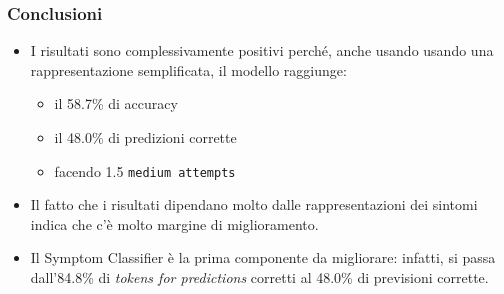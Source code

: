 \documentclass{beamer}
\begin{document}

\begin{frame}
\frametitle{Conclusioni}
\begin{itemize}
\item I risultati sono complessivamente positivi perché, anche usando usando una rappresentazione semplificata, il modello raggiunge: 
 \begin{itemize}
  \item il 58.7\% di accuracy
  \item il 48.0\% di predizioni corrette
  \item facendo 1.5 \texttt{medium attempts}
 \end{itemize}\pause
 \item Il fatto che i risultati dipendano molto dalle rappresentazioni dei sintomi indica che c'è molto margine di miglioramento.\pause
 \item Il Symptom Classifier è la prima componente da migliorare: infatti, si passa dall'84.8\% di \emph{tokens for predictions} corretti al 48.0\% di previsioni corrette.
\end{itemize}
\end{frame}
\end{document}
